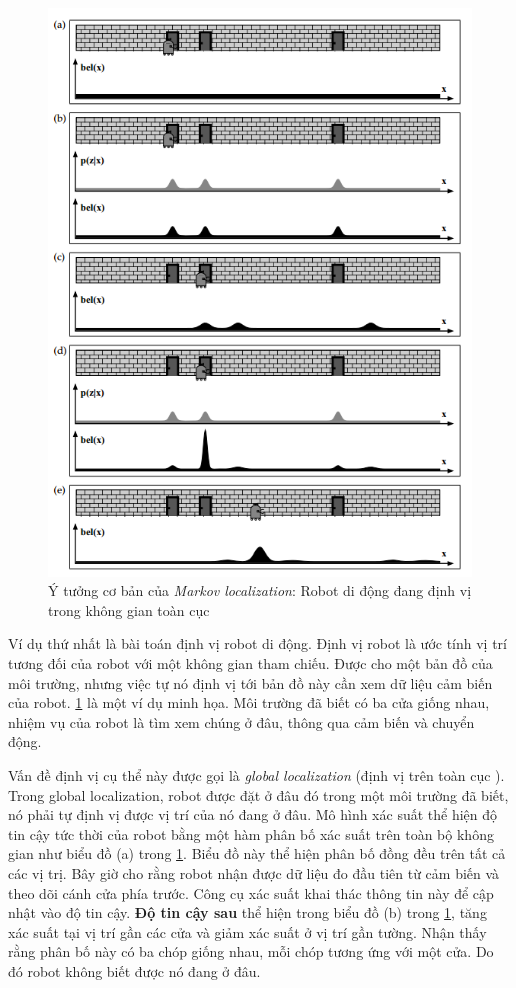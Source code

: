 \begin{figure}[htbp]
  \centering
  \includegraphics[width=0.8\linewidth]{figures/markovLocalization.png}
  \caption{Ý tưởng cơ bản của \textit{Markov localization}: Robot di động đang định vị trong không gian toàn cục \cite{thrun2005probabilistic}}
  \label{fig:markovLocalization}
\end{figure}

Ví dụ thứ nhất là bài toán định vị robot di động. Định vị robot là ước tính vị trí tương đối của robot với một không gian tham chiếu. Được cho một bản đồ của môi trường, nhưng việc tự nó định vị tới bản đồ này cần xem dữ liệu cảm biến của robot. \figurename{\ref{fig:markovLocalization}} là một ví dụ minh họa. Môi trường đã biết có ba cửa giống nhau, nhiệm vụ của robot là tìm xem chúng ở đâu, thông qua cảm biến và chuyển động.

Vấn đề định vị cụ thể này được gọi là \textit{global localization} (định vị trên toàn cục ). Trong global localization, robot được đặt ở đâu đó trong một môi trường đã biết, nó phải tự định vị được vị trí của nó đang ở đâu. Mô hình xác suất thể hiện độ tin cậy tức thời của robot bằng một hàm phân bố xác suất trên toàn bộ không gian như biểu đồ (a) trong \figurename{\ref{fig:markovLocalization}}. Biểu đồ này thể hiện phân bố đồng đều trên tất cả các vị trị. Bây giờ cho rằng robot nhận được dữ liệu đo đầu tiên từ cảm biến và theo dõi cánh cửa phía trước. Công cụ xác suất khai thác thông tin này để cập nhật vào độ tin cậy.
\textbf{Độ tin cậy sau}
thể hiện trong biểu đồ (b) trong \figurename{\ref{fig:markovLocalization}}, tăng xác suất tại vị trí gần các cửa và giảm xác suất ở vị trí gần tường.
Nhận thấy rằng phân bố này có ba chóp giống nhau, mỗi chóp tương ứng với một cửa. Do đó robot không biết được nó đang ở đâu.

